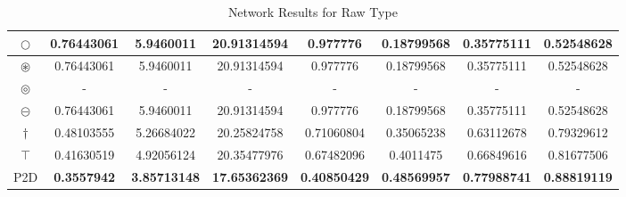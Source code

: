\begin{table}[!h]
{\begin{tabular}{|c|c|c|c|c|c|c|c|}
			$\bigcirc$       & 0.76443061 & 5.9460011   & 20.91314594 & 0.977776   & 0.18799568     & 0.35775111       & 0.52548628       \\ \hline
			$\circledast$    & 0.76443061 & 5.9460011   & 20.91314594 & 0.977776   & 0.18799568     & 0.35775111       & 0.52548628       \\ \hline
			$\circledcirc$   & -          & -           & -           & -          & -              & -                & -                \\ \hline
			$\circleddash$   & 0.76443061 & 5.9460011   & 20.91314594 & 0.977776   & 0.18799568     & 0.35775111       & 0.52548628       \\ \hline
			$\dagger$        & 0.48103555 & 5.26684022  & 20.25824758 & 0.71060804 & 0.35065238     & 0.63112678       & 0.79329612       \\ \hline
			$\intercal$      & 0.41630519 & 4.92056124  & 20.35477976 & 0.67482096 & 0.4011475      & 0.66849616       & 0.81677506       \\ \hline
			P2D                  & \textbf{0.3557942} & \textbf{3.85713148} & \textbf{17.65362369} & \textbf{0.40850429} & \textbf{0.48569957} & \textbf{0.77988741} & \textbf{0.88819119} \\ \hline
		\end{tabular}%
	}
	\caption{Network Results for Raw Type}
	\label{tab:my-table2}
\end{table}




